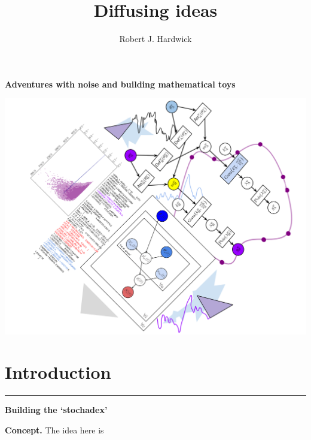 \documentclass[sts]{imsart}
\begin{document}
\begin{titlepage}

\title{Diffusing ideas}
\vspace*{0.3cm}
\hspace*{-0.5cm}
{\Large \bfseries\sffamily \color{gray75} Adventures with noise and building mathematical toys}

\vspace*{3cm}
\centering
\includegraphics[width=15cm]{images/frontmatter_mashup.png}

\vspace*{4cm}
\author{Robert J. Hardwick}


\end{titlepage}

\newpage

\section*{Introduction}


\newpage
{\color{gray75} {\Huge \bfseries{}} \hspace*{0.2em} \rule[-0.5ex]{0.3ex}{2.0em}} \hspace*{0.2em} {\Huge \bfseries\sffamily Building the `stochadex'}

\vspace*{1cm}
{\bfseries\sffamily Concept.} The idea here is 
\end{document}
